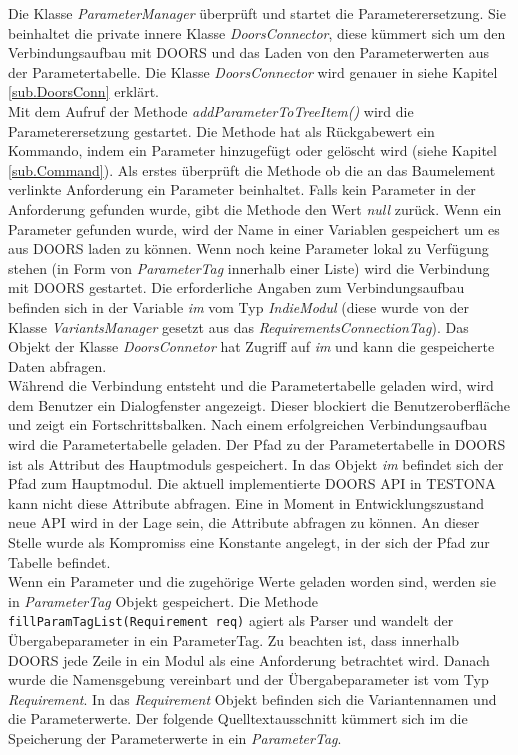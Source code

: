 Die Klasse \textit{ParameterManager} überprüft und startet die Parameterersetzung. Sie beinhaltet die private innere Klasse \textit{DoorsConnector}, diese kümmert sich um den Verbindungsaufbau mit DOORS und das Laden von den Parameterwerten aus der Parametertabelle. Die Klasse \textit{DoorsConnector} wird genauer in siehe Kapitel \ref{sub.DoorsConn} erklärt.\\


Mit dem Aufruf der Methode \textit{addParameterToTreeItem()} wird die Parameterersetzung gestartet. Die Methode hat als Rückgabewert ein Kommando, indem ein Parameter hinzugefügt oder gelöscht wird (siehe Kapitel \ref{sub.Command}). Als erstes überprüft die Methode ob die an das Baumelement verlinkte Anforderung ein Parameter beinhaltet. Falls kein Parameter in der Anforderung gefunden wurde, gibt die Methode den Wert \textit{null} zurück. Wenn ein Parameter gefunden wurde, wird der Name in einer Variablen gespeichert um es aus DOORS laden zu können. Wenn noch keine Parameter lokal zu Verfügung stehen (in Form von \textit{ParameterTag} innerhalb einer Liste) wird die Verbindung mit DOORS gestartet. Die erforderliche Angaben zum Verbindungsaufbau befinden sich in der Variable \textit{im} vom Typ \textit{IndieModul} (diese wurde von der Klasse \textit{VariantsManager} gesetzt aus das \textit{RequirementsConnectionTag}). Das Objekt der Klasse \textit{DoorsConnetor} hat Zugriff auf \textit{im} und kann die gespeicherte Daten abfragen.\\


Während die Verbindung entsteht und die Parametertabelle geladen wird, wird dem Benutzer ein Dialogfenster angezeigt. Dieser blockiert die Benutzeroberfläche und zeigt ein Fortschrittsbalken. Nach einem erfolgreichen Verbindungsaufbau wird die Parametertabelle geladen. Der Pfad zu der Parametertabelle in DOORS ist als Attribut des Hauptmoduls gespeichert. In das Objekt \textit{im} befindet sich der Pfad zum Hauptmodul. Die aktuell implementierte DOORS API in TESTONA kann nicht diese Attribute abfragen. Eine in Moment in Entwicklungszustand neue API wird in der Lage sein, die Attribute abfragen zu können. An dieser Stelle wurde als Kompromiss eine Konstante angelegt, in der sich der Pfad zur Tabelle befindet.\\

 
Wenn ein Parameter und die zugehörige Werte geladen worden sind, werden sie in \textit{ParameterTag} Objekt gespeichert. Die Methode \texttt{fillParamTagList(Requirement req)} agiert als Parser und wandelt der Übergabeparameter in ein ParameterTag. Zu beachten ist, dass innerhalb DOORS jede Zeile in ein Modul als eine Anforderung betrachtet wird. Danach wurde die Namensgebung vereinbart und der Übergabeparameter ist vom Typ \textit{Requirement}. In das \textit{Requirement} Objekt befinden sich die Variantennamen und die Parameterwerte. Der folgende Quelltextausschnitt kümmert sich im die Speicherung der Parameterwerte in ein \textit{ParameterTag}.\\



